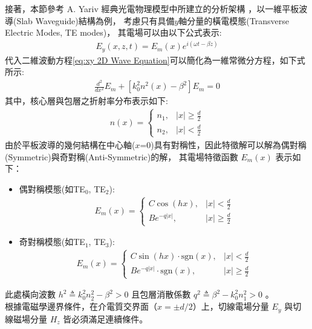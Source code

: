 接著，本節參考 A. Yariv 經典光電物理模型中所建立的分析架構 \cite{yariv2007_photonics}，以一維平板波導(Slab Waveguide)結構為例，
考慮只有具備$y$軸分量的橫電模態(Transverse Electric Modes, TE modes)，
其電場可以由以下公式表示:
\begin{align}
E_y(x,z,t)=E_m(x)e^{i(\omega t-\beta z)}
\label{eq:TE mode electric field in slab waveguide}
\end{align}
代入二維波動方程\eqref{eq:xy 2D Wave Equation}可以簡化為一維常微分方程，如下式所示:
\begin{align}
\frac{d^{2}}{d x^{2}}E_{m} + \left[ k_{0}^{2}n^{2}(x) - \beta^{2} \right] E_{m} = 0
\label{eq:TE mode 1D differential equation in slab waveguide}
\end{align}
其中，核心層與包層之折射率分布表示如下:
\begin{align}
n(x) = \begin{cases} n_1, & |x| \ge \frac{d}{2} \\ n_2, & |x| < \frac{d}{2} \end{cases}
\end{align}
由於平板波導的幾何結構在中心軸($x$=0)具有對稱性，因此特徵解可以解為偶對稱(Symmetric)與奇對稱(Anti-Symmetric)的解，
其電場特徵函數 $E_m(x)$ 表示如下：
\begin{itemize}
    \item 偶對稱模態(如TE$_0$, TE$_2$):
    \begin{align}
E_{m}(x) = \begin{cases} C \cos(hx), & |x| < \frac{d}{2} \\ B e^{-q |x|}, & |x| \ge \frac{d}{2} \end{cases}
\label{eq:TE mode symmetric solution}
\end{align}
    \item 奇對稱模態(如TE$_1$, TE$_3$):
    \begin{align}
E_{m}(x) = \begin{cases} C \sin(hx) \cdot \text{sgn}(x), & |x| < \frac{d}{2} \\ B e^{-q |x|} \cdot \text{sgn}(x), & |x| \ge \frac{d}{2} \end{cases}
\label{eq:TE mode anti symmetric solution}
\end{align}
\end{itemize}
此處橫向波數 $h^2 \triangleq k_0^2 n_2^2 - \beta^2 > 0$ 且包層消散係數 $q^2 \triangleq \beta^2 - k_0^2 n_1^2 > 0$ 。\\
根據電磁學邊界條件，在介電質交界面（$x = \pm d/2$）上，切線電場分量 $E_y$ 與切線磁場分量 $H_z$ 皆必須滿足連續條件。
